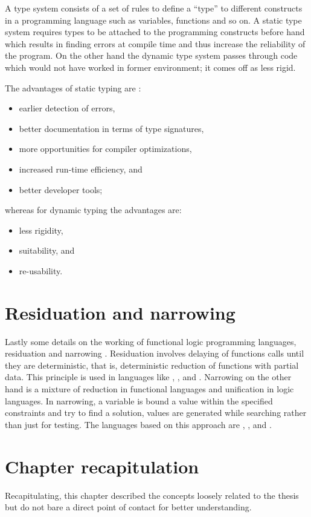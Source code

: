 \documentclass[proposal.tex]{subfiles}
\begin{document}
A type system consists of a set of rules to define a ``type'' to different constructs in a
programming language such as variables, functions and so on.
A static type system requires types to be attached to the programming constructs before hand which results in
finding errors at compile time and thus increase the reliability of the program.
On the other hand the dynamic type system passes through code which would not have worked in former
environment; it comes off as less rigid.


The advantages of static typing \cite{meijer2004static} are :
\begin{itemize}
\item earlier detection of errors,
\item better documentation in terms of type signatures,
\item more opportunities for compiler optimizations,
\item increased run-time efficiency, and
\item better developer tools;
\end{itemize}

whereas for dynamic typing the advantages are:
\begin{itemize}
\item less rigidity,
\item suitability, and
\item re-usability.
\end{itemize}

\section{Residuation and narrowing}
Lastly some details on the working of functional logic programming languages, residuation and narrowing
\cite{hanus1995curry,webiste:wikicurry}.
Residuation involves delaying of functions calls until they are deterministic, that is, deterministic reduction of
functions with partial data.
This principle is used in languages like  \cite{lloyd1999programming:escher}, 
\cite{website:life},  \cite{website:nue-prolog} and  \cite{website:oz-mozart}.
Narrowing on the other hand is a mixture of reduction in functional languages and unification in logic languages.
In narrowing, a variable is bound a value within the specified constraints and try to find a solution, values are
generated while searching rather than just for testing.
The languages based on this approach are  \cite{website:alf},  \cite{website:babel},
 \cite{bert1987lpg} and  \cite{website:curry}.


\section{Chapter recapitulation}
Recapitulating, this chapter described the concepts loosely related to the thesis but do not bare a direct point of
contact for better understanding.
\end{document}
